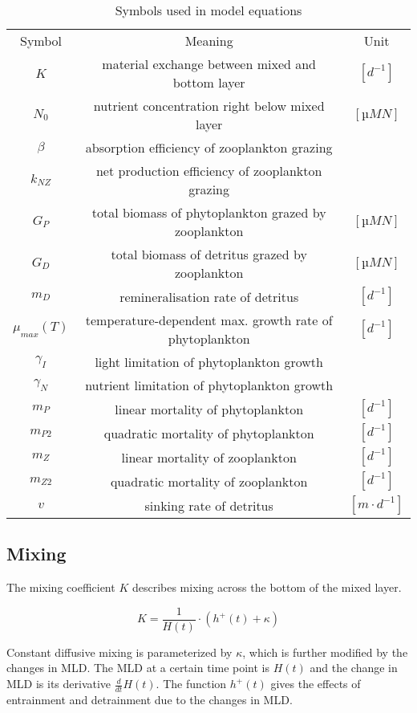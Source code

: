 \documentclass[journal abbreviation, manuscript]{copernicus}
\begin{document}
\begin{table*}[t]
\caption{Symbols used in model equations}
\begin{tabular}{c c c}
Symbol & Meaning & Unit\\
\tophline
$K$ & material exchange between mixed and bottom layer & $[d^{-1}]$ \\
$N_0$ & nutrient concentration right below mixed layer & $[µM N]$ \\
$\beta$ & absorption efficiency of zooplankton grazing &  \\
$k_{NZ}$ & net production efficiency of zooplankton grazing &  \\
$G_P$ & total biomass of phytoplankton grazed by zooplankton & $[µM N]$ \\
$G_D$ & total biomass of detritus grazed by zooplankton & $[µM N]$ \\
$m_D$ & remineralisation rate of detritus & $[d^{-1}]$ \\
$\mu_{max}(T)$ & temperature-dependent max. growth rate of phytoplankton & $[d^{-1}]$ \\
$\gamma_I$ & light limitation of phytoplankton growth &  \\
$\gamma_N$ & nutrient limitation of phytoplankton growth &  \\
$m_P$ & linear mortality of phytoplankton & $[d^{-1}]$ \\
$m_{P2}$ & quadratic mortality of phytoplankton & $[d^{-1}]$ \\
$m_Z$ & linear mortality of zooplankton & $[d^{-1}]$ \\
$m_{Z2}$ & quadratic mortality of zooplankton & $[d^{-1}]$ \\
$v$ & sinking rate of detritus & $[m \cdot d^{-1}]$\\
\end{tabular}
\end{table*}
\subsection{Mixing}

The mixing coefficient $K$ describes mixing across the bottom of the mixed layer.

\begin{equation}
    K = \frac{1}{H(t)} \cdot \left(h^{+}(t) + \kappa\right)
\end{equation}

Constant diffusive mixing is parameterized by $\kappa$, which is further modified by the changes in MLD. The MLD at a certain time point is $H(t)$ and the change in MLD is its derivative $\frac{d}{d t} H(t)$. The function $h^{+}(t)$ gives the effects of entrainment and detrainment due to the changes in MLD.
\end{document}
